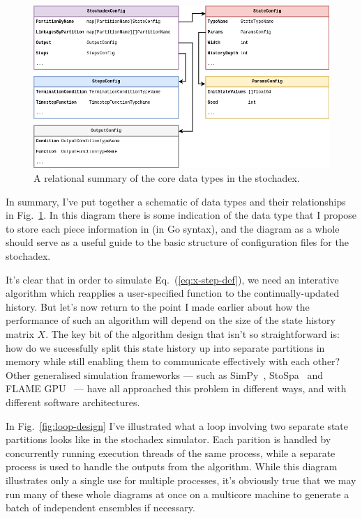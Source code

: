 \documentclass{book}
\begin{document}
\begin{figure}[h]
\centering
\includegraphics[width=15cm]{images/stochadex-data-types.drawio.png}
\caption{A relational summary of the core data types in the stochadex.}
\label{fig:data-types-design}
\end{figure}

In summary, I've put together a schematic of data types and their relationships in Fig.~\ref{fig:data-types-design}. In this diagram there is some indication of the data type that I propose to store each piece information in (in Go syntax), and the diagram as a whole should serve as a useful guide to the basic structure of configuration files for the stochadex.

It's clear that in order to simulate Eq.~(\ref{eq:x-step-def}), we need an interative algorithm which reapplies a user-specified function to the continually-updated history. But let's now return to the point I made earlier about how the performance of such an algorithm will depend on the size of the state history matrix $X$. The key bit of the algorithm design that isn't so straightforward is: how do we sucessfully split this state history up into separate partitions in memory while still enabling them to communicate effectively with each other? Other generalised simulation frameworks --- such as SimPy~\cite{simpy}, StoSpa~\cite{stospa} and FLAME GPU~\cite{flamegpu} --- have all approached this problem in different ways, and with different software architectures. 

In Fig.~\ref{fig:loop-design} I've illustrated what a loop involving two separate state partitions looks like in the stochadex simulator. Each parition is handled by concurrently running execution threads of the same process, while a separate process is used to handle the outputs from the algorithm. While this diagram illustrates only a single use for multiple processes, it's obviously true that we may run many of these whole diagrams at once on a multicore machine to generate a batch of independent ensembles if necessary.
\end{document}
